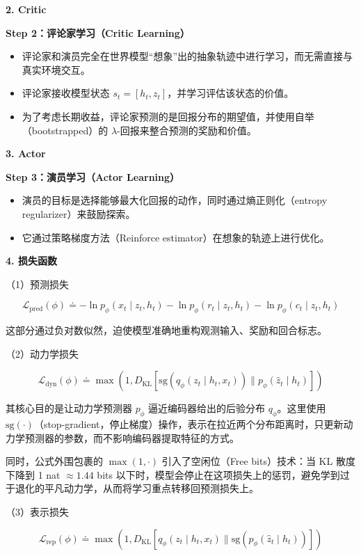\textbf{2. Critic}

\textbf{Step 2：评论家学习（Critic Learning）}

\begin{itemize}
\tightlist
\item
  评论家和演员完全在世界模型``想象''出的抽象轨迹中进行学习，而无需直接与真实环境交互。
\item
  评论家接收模型状态 \(s_t = [h_t, z_t]\)，并学习评估该状态的价值。
\item
  为了考虑长期收益，评论家预测的是回报分布的期望值，并使用自举（bootstrapped）的 \(\lambda\)-回报来整合预测的奖励和价值。
\end{itemize}

\textbf{3. Actor}

\textbf{Step 3：演员学习（Actor Learning）}

\begin{itemize}
\tightlist
\item
  演员的目标是选择能够最大化回报的动作，同时通过熵正则化（entropy regularizer）来鼓励探索。
\item
  它通过策略梯度方法（Reinforce estimator）在想象的轨迹上进行优化。
\end{itemize}

\textbf{4. 损失函数}

（1）预测损失

\[
\mathcal{L}_{\mathrm{pred}}(\phi)
\doteq
-\ln p_{\phi}(x_t \mid z_t, h_t)
-\ln p_{\phi}(r_t \mid z_t, h_t)
-\ln p_{\phi}(c_t \mid z_t, h_t)
\]

这部分通过负对数似然，迫使模型准确地重构观测输入、奖励和回合标志。

（2）动力学损失

\[
\mathcal{L}_{\mathrm{dyn}}(\phi)
\doteq
\max\left(
1,
D_{\mathrm{KL}}\left[
\mathrm{sg}(q_{\phi}(z_t \mid h_t, x_t))
\parallel
p_{\phi}(\hat{z}_t \mid h_t)
\right]
\right)
\]

其核心目的是让动力学预测器 \(p_{\phi}\) 逼近编码器给出的后验分布 \(q_{\phi}\)。这里使用 \(\mathrm{sg}(\cdot)\)（stop-gradient，停止梯度）操作，表示在拉近两个分布距离时，只更新动力学预测器的参数，而不影响编码器提取特征的方式。

同时，公式外围包裹的 \(\max(1, \cdot)\) 引入了空闲位（Free bits）技术：当 KL 散度下降到 1 nat \(\approx 1.44\) bits 以下时，模型会停止在这项损失上的惩罚，避免学到过于退化的平凡动力学，从而将学习重点转移回预测损失上。

（3）表示损失

\[
\mathcal{L}_{\mathrm{rep}}(\phi)
\doteq
\max\left(
1,
D_{\mathrm{KL}}\left[
q_{\phi}(z_t \mid h_t, x_t)
\parallel
\mathrm{sg}(p_{\phi}(\hat{z}_t \mid h_t))
\right]
\right)
\]

